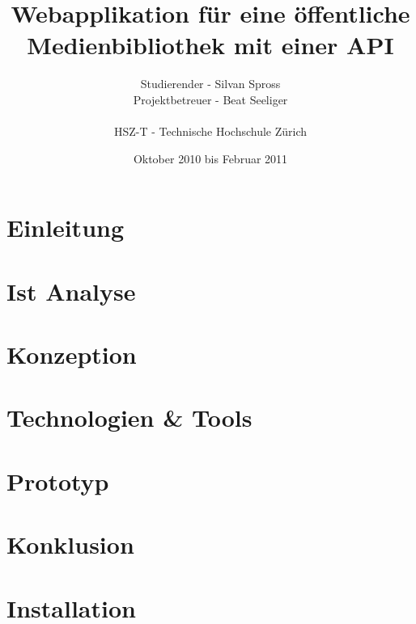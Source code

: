 \documentclass[abstracton,liststotoc,bibtotoc]{scrreprt}
\title{Webapplikation für eine öffentliche Medienbibliothek mit einer API}
\author{Studierender - Silvan Spross\\
    Projektbetreuer - Beat Seeliger\\
    \\
    HSZ-T - Technische Hochschule Zürich}
\date{Oktober 2010 bis Februar 2011}
\begin{document}
    \ifpdf
    \else
    \fi
    

    \maketitle
    
    
    

    \tableofcontents
    
    \clearpage

    \chapter{Einleitung}
    
    
    \chapter{Ist Analyse}
    
    
    \chapter{Konzeption}
    
    
    \chapter{Technologien \& Tools}
    
    
    \chapter{Prototyp}
    
    
    \chapter{Konklusion}
    
    
    \chapter{Installation}
    
    
\end{document}
